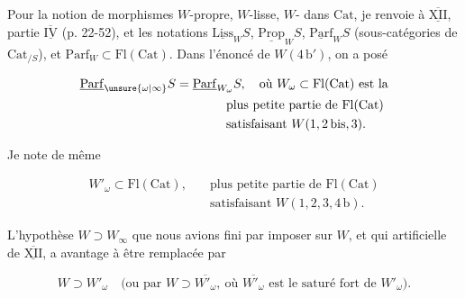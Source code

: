 Pour la notion de  morphismes $W$-propre, $W$-lisse, $W$- dans $\mathrm{Cat}$, je renvoie à $\overline{\underline{\mathrm{XII}}}$, partie $\overline{\underline{\mathrm{IV}}}$ (p. 22-52), et les notations $\underline{\mathrm{Liss}}_W S$, $\underline{\mathrm{Prop}}_W S$, $\underline{\mathrm{Parf}}_W S$  (sous-catégories de $\mathrm{Cat}_{/S}$), et $\mathrm{Parf}_W\subset\mathrm{Fl}(\mathrm{Cat})$. Dans l'énoncé de $W(4\,\mathrm b')$, on a posé

\[
\begin{aligned}
\underline{\mathrm{Parf}}_{\unsure{\omega|\infty}}S
 &=\underline{\mathrm{Parf}}_{W_\omega}S,\quad \text{où }W_\omega\subset\mathrm{Fl}(\mathrm{Cat})\text{ est la}\\
 &\hspace{4em}\text{plus petite partie de }\mathrm{Fl}(\mathrm{Cat})\\
 &\hspace{4em}\text{satisfaisant }W(1,2\,\mathrm{bis},3).
\end{aligned}
\]

Je note de même

\[
\begin{aligned}
W'_\omega\subset\mathrm{Fl}(\mathrm{Cat}),\quad &\text{plus petite partie de }\mathrm{Fl}(\mathrm{Cat})\\
 &\text{satisfaisant }W(1,2,3,4\,\mathrm b).
\end{aligned}
\]

L'hypothèse $W\supset W_\infty$ que nous avions fini par imposer sur $W$, et qui   artificielle     de $\overline{\underline{\mathrm{XII}}}$, a avantage à être remplacée par

\[
 W\supset W'_\omega\quad \text{(ou par }W\supset\overline{W'_\omega},\ \text{où }\overline{W'_\omega}\text{ est le saturé fort de }W'_\omega\text{).}
\]


